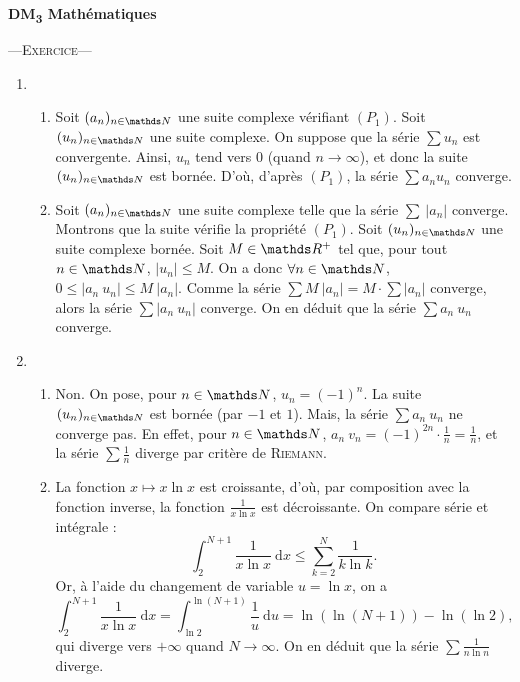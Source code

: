 \documentclass[a4paper]{article}
\begin{document}
	\begin{center}
		\Huge \textbf{DM\textsubscript3 Mathématiques}
	\end{center}

	\begin{center}
		\LARGE ---\quad\textsc{Exercice}\quad---
	\end{center}

	\begin{enumerate}
		\item
			\begin{enumerate}
				\item Soit $(a_n)_{n\in\N}$\/ une suite complexe vérifiant $(P_1)$. Soit $(u_n)_{n\in\N}$\/ une suite complexe. On suppose que la série $\sum u_n$\/ est convergente. Ainsi, $u_n$\/ tend vers 0 (quand $n \to \infty$), et donc la suite $(u_n)_{n\in\N}$\/ est bornée. D'où, d'après $(P_1)$, la série $\sum a_n u_n$\/ converge.
				\item Soit $(a_n)_{n\in\N}$\/ une suite complexe telle que la série $\sum\:|a_n|$\/ converge. Montrons que la suite vérifie la propriété $(P_1)$. Soit $(u_n)_{n\in\N}$\/ une suite complexe bornée. Soit $M \in \R^+$\/ tel que, pour tout $n \in \N$, $|u_n| \le M$. On a donc $\forall n \in \N$, $0 \le |a_n\:u_n| \le M\:|a_n|$. Comme la série $\sum M\:|a_n| = M \cdot \sum |a_n|$\/ converge, alors la série $\sum |a_n\:u_n|$\/ converge. On en déduit que la série $\sum a_n\:u_n$\/ converge.
			\end{enumerate}
		\item
			\begin{enumerate}
				\item Non. On pose, pour $n \in \N$, $u_n = (-1)^n$. La suite $(u_n)_{n\in\N}$\/ est bornée (par $-1$\/ et $1$). Mais, la série $\sum a_n\:u_n$\/ ne converge pas. En effet, pour $n \in \N$, $a_n\:v_n = (-1)^{2n} \cdot \frac{1}{n} = \frac{1}{n}$, et la série $\sum \frac{1}{n}$\/ diverge par critère de \textsc{Riemann}.
				\item La fonction $x\mapsto x \ln x$\/ est croissante, d'où, par composition avec la fonction inverse, la fonction $\frac{1}{x \ln x}$\/ est décroissante. On compare série et intégrale : \[
						\int_{2}^{N+1} \frac{1}{x \ln x}~\mathrm{d}x \le \sum_{k=2}^N \frac{1}{k \ln k}
					.\] Or, à l'aide du changement de variable $u = \ln x$, on a \[
						\int_{2}^{N+1} \frac{1}{x \ln x}~\mathrm{d}x = \int^{\ln(N+1)}_{\ln 2} \frac{1}{u}~\mathrm{d}u = \ln(\ln(N+1)) - \ln(\ln 2),
					\] qui diverge vers $+\infty$\/ quand $N \to \infty$. On en déduit que la série $\sum \frac{1}{n \ln n}$\/ diverge.

\end{enumerate}
\end{enumerate}
\end{document}
